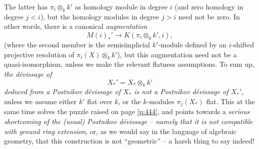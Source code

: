 The latter has $\pi_i\otimes_k k'$ as homology module in
degree $i$ (and zero homology in degree $j<i$), but the homology
modules in degree $j>i$ need not be zero. In other words, there is a
canonical \emph{augmentation}
\begin{equation}
  \label{eq:113.Bdblprime}
  M(i)_*' \to K(\pi_i\otimes_k k', i),\tag{B''}
\end{equation}
(where the second member is the semisimplicial $k'$-module defined by
an $i$-shifted projective resolution of $\pi_i(X)\otimes_k k'$), but
this augmentation need not be a quasi-isomorphism, unless we make the
relevant flatness assumptions. To sum up, \emph{the dévissage of}
\[X_*' = X_*\otimes_k k'\]
\emph{deduced from a Postnikov dévissage of $X_*$ is \emph{not} a
  Postnikov dévissage of $X_*'$}, unless we assume either $k'$ flat
over $k$, or the $k$-modules $\pi_j(X_*)$ flat. This at the same time
solves the puzzle raised on page \ref{p:444}, and points towards a
\emph{serious shortcoming of the \textup(usual\textup) Postnikov
  dévissage -- namely that it is not compatible with ground ring
  extension}, or, as we would say in the language of algebraic
geometry, that this construction is not ``geometric'' -- a harsh thing
to say indeed!

